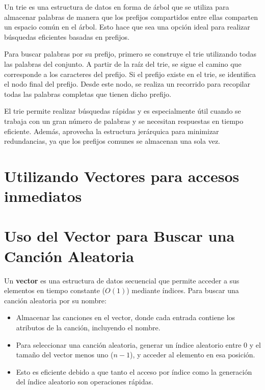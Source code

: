 \documentclass[corference]{IEEEtran}
\begin{document}
\begin{flushleft}
        \noindent\hspace*{4em}Un trie es una estructura de datos en forma de árbol que se utiliza para almacenar palabras de manera que los prefijos compartidos entre ellas comparten un espacio común en el árbol. Esto hace que sea una opción ideal para realizar búsquedas eficientes basadas en prefijos.

        \noindent\hspace*{4em}Para buscar palabras por su prefijo, primero se construye el trie utilizando todas las palabras del conjunto. A partir de la raíz del trie, se sigue el camino que corresponde a los caracteres del prefijo. Si el prefijo existe en el trie, se identifica el nodo final del prefijo. Desde este nodo, se realiza un recorrido para recopilar todas las palabras completas que tienen dicho prefijo.
        
        \noindent\hspace*{4em}El trie permite realizar búsquedas rápidas y es especialmente útil cuando se trabaja con un gran número de palabras y se necesitan respuestas en tiempo eficiente. Además, aprovecha la estructura jerárquica para minimizar redundancias, ya que los prefijos comunes se almacenan una sola vez.
        
        \section{Utilizando Vectores para accesos inmediatos}

        \section{Uso del Vector para Buscar una Canción Aleatoria}
            \noindent\hspace{4em}Un \textbf{vector} es una estructura de datos secuencial que permite acceder a sus elementos en tiempo constante (\(O(1)\)) mediante índices. Para buscar una canción aleatoria por su nombre:
            \begin{itemize}
                \item Almacenar las canciones en el vector, donde cada entrada contiene los atributos de la canción, incluyendo el nombre.
                \item Para seleccionar una canción aleatoria, generar un índice aleatorio entre \(0\) y el tamaño del vector menos uno (\(n-1\)), y acceder al elemento en esa posición.
                \item Esto es eficiente debido a que tanto el acceso por índice como la generación del índice aleatorio son operaciones rápidas.
            \end{itemize}
        

\end{flushleft}
\end{document}
